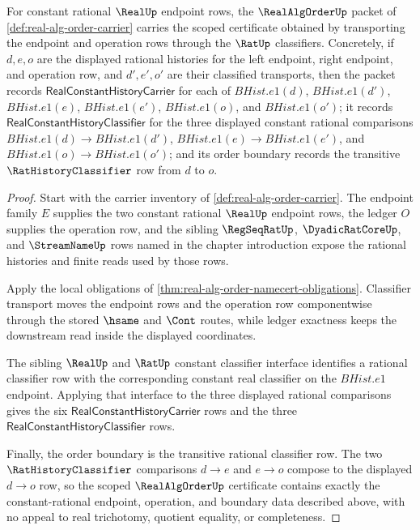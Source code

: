 \begin{theorem}
\label{thm:real-alg-order-constant-rational-scoped-certificate}
For constant rational $\RealUp$ endpoint rows, the $\RealAlgOrderUp$ packet of \autoref{def:real-alg-order-carrier} carries the scoped certificate obtained by transporting the endpoint and operation rows through the $\RatUp$ classifiers. Concretely, if $d,e,o$ are the displayed rational histories for the left endpoint, right endpoint, and operation row, and $d',e',o'$ are their classified transports, then the packet records $\mathsf{RealConstantHistoryCarrier}$ for each of $BHist.e1(d)$, $BHist.e1(d')$, $BHist.e1(e)$, $BHist.e1(e')$, $BHist.e1(o)$, and $BHist.e1(o')$; it records $\mathsf{RealConstantHistoryClassifier}$ for the three displayed constant rational comparisons $BHist.e1(d)\to BHist.e1(d')$, $BHist.e1(e)\to BHist.e1(e')$, and $BHist.e1(o)\to BHist.e1(o')$; and its order boundary records the transitive $\RatHistoryClassifier$ row from $d$ to $o$.
\end{theorem}
\begin{proof}
Start with the carrier inventory of \autoref{def:real-alg-order-carrier}. The endpoint family $E$ supplies the two constant rational $\RealUp$ endpoint rows, the ledger $O$ supplies the operation row, and the sibling $\RegSeqRatUp$, $\DyadicRatCoreUp$, and $\StreamNameUp$ rows named in the chapter introduction expose the rational histories and finite reads used by those rows.

Apply the local obligations of \autoref{thm:real-alg-order-namecert-obligations}. Classifier transport moves the endpoint rows and the operation row componentwise through the stored $\hsame$ and $\Cont$ routes, while ledger exactness keeps the downstream read inside the displayed coordinates.

The sibling $\RealUp$ and $\RatUp$ constant classifier interface identifies a rational classifier row with the corresponding constant real classifier on the $BHist.e1$ endpoint. Applying that interface to the three displayed rational comparisons gives the six $\mathsf{RealConstantHistoryCarrier}$ rows and the three $\mathsf{RealConstantHistoryClassifier}$ rows.

Finally, the order boundary is the transitive rational classifier row. The two $\RatHistoryClassifier$ comparisons $d\to e$ and $e\to o$ compose to the displayed $d\to o$ row, so the scoped $\RealAlgOrderUp$ certificate contains exactly the constant-rational endpoint, operation, and boundary data described above, with no appeal to real trichotomy, quotient equality, or completeness.
\end{proof}

